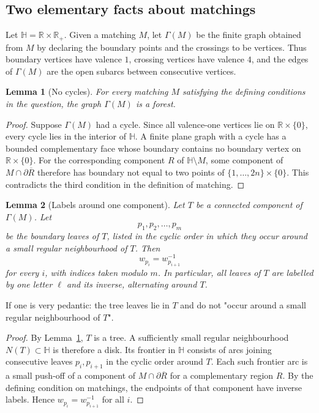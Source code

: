 \documentclass[12pt]{article}
\newtheorem{lemma}{Lemma}
\newcommand{\HH}{\mathbb H}
\newcommand{\bd}{\partial}
\newcommand{\review}[1]{\begin{reviewbox}#1\end{reviewbox}}
\begin{document}
\subsection{Two elementary facts about matchings}

Let \(\HH=\mathbb R\times \mathbb R_+\).  Given a matching \(M\), let \(\Gamma(M)\) be the finite graph obtained from \(M\) by declaring the boundary points and the crossings to be vertices.  Thus boundary vertices have valence \(1\), crossing vertices have valence \(4\), and the edges of \(\Gamma(M)\) are the open subarcs between consecutive vertices.

\begin{lemma}[No cycles]\label{lem:forest}
For every matching \(M\) satisfying the defining conditions in the question, the graph \(\Gamma(M)\) is a forest.
\end{lemma}

\begin{proof}
Suppose \(\Gamma(M)\) had a cycle.  Since all valence-one vertices lie on \(\mathbb R\times\{0\}\), every cycle lies in the interior of \(\HH\).  A finite plane graph with a cycle has a bounded complementary face whose boundary contains no boundary vertex on \(\mathbb R\times\{0\}\).  For the corresponding component \(R\) of \(\HH\setminus M\), some component of \(M\cap \bd \overline R\) therefore has boundary not equal to two points of \(\{1,\dots,2n\}\times\{0\}\).  This contradicts the third condition in the definition of matching.
\end{proof}

\begin{lemma}[Labels around one component]\label{lem:cycliclabels}
Let \(T\) be a connected component of \(\Gamma(M)\).  Let
\[
p_1,p_2,\dots,p_m
\]
be the boundary leaves of \(T\), listed in the cyclic order in which they occur around a small regular neighbourhood of \(T\).  Then
\[
w_{p_i}=w_{p_{i+1}}^{-1}
\]
for every \(i\), with indices taken modulo \(m\).  In particular, all leaves of \(T\) are labelled by one letter \(\ell\) and its inverse, alternating around \(T\).
\end{lemma}

\review{If one is very pedantic: the tree leaves lie in $T$ and do not "occur around a small regular neighbourhood of $T$".}

\begin{proof}
By Lemma~\ref{lem:forest}, \(T\) is a tree.  A sufficiently small regular neighbourhood \(N(T)\subset \HH\) is therefore a disk.  Its frontier in \(\HH\) consists of arcs joining consecutive leaves \(p_i,p_{i+1}\) in the cyclic order around \(T\).  Each such frontier arc is a small push-off of a component of \(M\cap \bd\overline R\) for a complementary region \(R\).  By the defining condition on matchings, the endpoints of that component have inverse labels.  Hence \(w_{p_i}=w_{p_{i+1}}^{-1}\) for all \(i\).
\end{proof}
\end{document}
